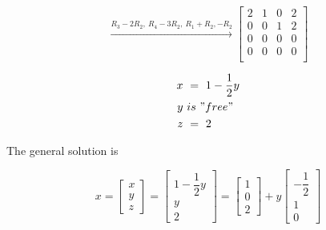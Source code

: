 \documentclass{article}
\begin{document}
	\[
	\xrightarrow{R_3-2R_2,\ R_4-3R_2,\ R_1+R_2, -R_2}
	\left[
		\begin{array}{ccc|c}
			2 & 1 & 0 & 2\\
			0 & 0 & 1 & 2\\
			0 & 0 & 0 & 0\\
			0 & 0 & 0 & 0\\
		\end{array}
	\right]
	\]
		
	\begin{align*}
		x\ &= \ 1-\dfrac{1}{2}y\\
		y\ &is \ "free"\\
		z\ &= \ 2	
	\end{align*}
		
	The general solution is
		
	\[
	x=
	\left[
		\begin{array}{c}
			x\\
			y\\
			z
		\end{array}
	\right]
	=
	\left[
		\begin{array}{c}
			1-\dfrac{1}{2}y\\
			y\\
			2
		\end{array}
	\right]
	=
	\left[
		\begin{array}{c}
			1\\
			0\\
			2
		\end{array}
	\right]
	+y
	\left[
		\begin{array}{c}
			-\dfrac{1}{2}\\
			1\\
			0
		\end{array}
	\right]
	\]
	
	
\end{document}
